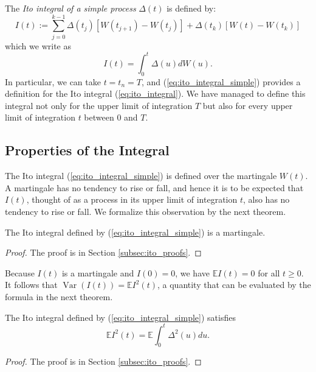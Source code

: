 \documentclass[\topdir/lecture\_notes.tex]{subfiles}
\begin{document}
The \emph{Ito integral of a simple process} \(\Delta(t)\) is defined by:
\begin{equation}
I(t):=\sum_{j=0}^{k-1} \Delta(t_{j})[W(t_{j+1})-W(t_{j})]+\Delta(t_{k})[W(t)-W(t_{k})] \label{eq:ito_integral_simple}
\end{equation}
which we write as
\begin{equation*}
I(t)=\int_{0}^{t} \Delta(u) dW(u).
\end{equation*}
In particular, we can take \(t=t_{n}=T\), and (\ref{eq:ito_integral_simple}) provides a definition for the Ito integral (\ref{eq:ito_integral}). We have managed to define this integral not only for the upper limit of integration \(T\) but also for every upper limit of integration \(t\) between 0 and \(T\).

\subsection{Properties of the Integral}\label{subsec:integral_properties}
The Ito integral (\ref{eq:ito_integral_simple}) is defined over the martingale \(W(t)\). A martingale has no tendency to rise or fall, and hence it is to be expected that \(I(t)\), thought of as a process in its upper limit of integration \(t\), also has no tendency to rise or fall. We formalize this observation by the next theorem.
\begin{theorem}\label{thm:ito_integral_martingale}
The Ito integral defined by (\ref{eq:ito_integral_simple}) is a martingale.
\end{theorem}
\begin{proof} The proof is in Section \ref{subsec:ito_proofs}.\end{proof}

Because \(I(t)\) is a martingale and \(I(0)=0\), we have \(\mathbb{E} I(t)=0\) for all \(t \geq 0\). It follows that \(\operatorname{Var}(I(t))=\mathbb{E} I^{2}(t)\), a quantity that can be evaluated by the formula in the next theorem.
\begin{theorem} \label{thm:ito_isometry}
The Ito integral defined by (\ref{eq:ito_integral_simple}) satisfies
\begin{equation*}
\mathbb{E} I^{2}(t)=\mathbb{E} \int_{0}^{t} \Delta^{2}(u) du.
\end{equation*}
\end{theorem}
\begin{proof} The proof is in Section \ref{subsec:ito_proofs}.\end{proof}
\end{document}
